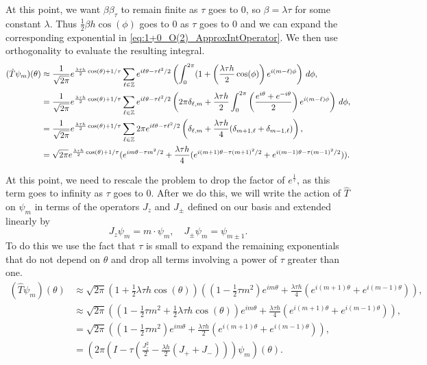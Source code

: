 \documentclass[11pt,reqno]{amsart}
\begin{document}
	At this point, we want $\beta\beta_\tau$ to remain finite as $\tau$ goes to 0, so $\beta=\lambda \tau$ for some constant $\lambda$. 
	Thus $\frac{1}{2}\beta h \cos(\phi)$ goes to 0 as $\tau$ goes to 0 and we can expand the corresponding exponential in \cref{eq:1+0_O(2)_ApproxIntOperator}.
	We then use orthogonality to evaluate the resulting integral.
	\begin{align*}
		(\hat{T}\psi_m)(\theta) &\approx \frac{1}{\sqrt{2\pi}}e^{\frac{\lambda\tau h}{2} \cos(\theta)+1/\tau} \sum_{\ell\in \mathbb{Z}} e^{i\ell\theta-\tau\ell^2/2}\left(\int_{0}^{2\pi} (1+\left(\frac{\lambda \tau h}{2}\cos(\phi) \right) e^{i(m-\ell)\phi}\right) \, d\phi,  \\
		&= \frac{1}{\sqrt{2\pi}}e^{\frac{\lambda\tau h}{2} \cos(\theta)+1/\tau} \sum_{\ell\in \mathbb{Z}} e^{i\ell\theta-\tau\ell^2/2}\left( 2\pi \delta_{\ell,m}+ \frac{\lambda \tau h}{2}\int_{0}^{2\pi} \left( \frac{e^{i\theta}+e^{-i\theta}}{2} \right)  e^{i(m-\ell)\phi}\right) \, d\phi,  \\
		&= \frac{1}{\sqrt{2\pi}} e^{\frac{\lambda\tau h}{2} \cos(\theta)+1/\tau} \sum_{\ell\in \mathbb{Z}} 2\pi e^{i\ell\theta-\tau\ell^2/2}\left(\delta_{\ell,m}+ \frac{\lambda \tau h}{4}(\delta_{m+1,\ell}+\delta_{m-1,\ell}) \right),  \\
		&= \sqrt{2\pi} e^{\frac{\lambda\tau h}{2} \cos(\theta)+1/\tau} ( e^{im\theta - \tau m^2/2}+ \frac{\lambda \tau h}{4} (e^{i(m+1)\theta - \tau (m+1)^2/2}+ e^{i(m-1)\theta - \tau (m-1)^2/2} ) ). 
	\end{align*}
	
	At this point, we need to rescale the problem to drop the factor of $e^\frac{1}{\tau}$, as this term goes to infinity as $\tau$ goes to 0.
	After we do this, we will write the action of $\hat{T}$ on $\psi_m$ in terms of the operators $J_z$ and $J_{\pm}$ defined on our basis and extended linearly by 
		\[J_z \psi_m = m \cdot \psi_m, \quad J_{\pm} \psi_m = \psi_{m\pm1}. \]
	To do this we use the fact that $\tau$ is small to expand the remaining exponentials that do not depend on $\theta$ and drop all terms involving a power of $\tau$ greater than one.
	\begin{align}
		(\hat{T}\psi_m)(\theta) &\approx \sqrt{2\pi} \left( 1+\frac{1}{2}\lambda\tau h \cos(\theta)\right) \left( \left( 1- \frac{1}{2}\tau m^2\right) e^{im\theta}+ \frac{\lambda \tau h}{4} \left( e^{i(m+1)\theta}+ e^{i(m-1)\theta} \right) \right) ,\nonumber\\
		&\approx\sqrt{2\pi} \left( \left( 1- \frac{1}{2}\tau m^2+\frac{1}{2}\lambda\tau h \cos(\theta)\right)  e^{im\theta}+ \frac{\lambda \tau h}{4} \left( e^{i(m+1)\theta}+ e^{i(m-1)\theta} \right) \right),\nonumber\\
		&=\sqrt{2\pi} \left( \left( 1- \frac{1}{2}\tau m^2\right)  e^{im\theta}+ \frac{\lambda \tau h}{2} \left( e^{i(m+1)\theta}+ e^{i(m-1)\theta} \right) \right),\nonumber\\
		&=\left( 2\pi \left( I-\tau \left( \frac{J_z^2}{2} - \frac{\lambda h}{2}(J_+ + J_-)\right) \right) \psi_m \right)(\theta).\label{eq:1+0_O(2)_Op_1-tH_Form}
	\end{align}
	
\end{document}
